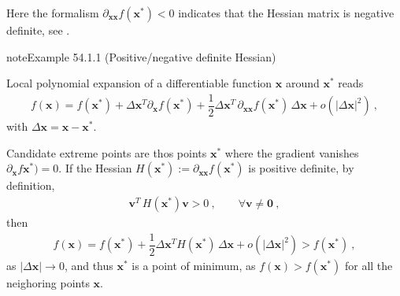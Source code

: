 \documentclass[letterpaper,10pt,english]{jupyterBook}
\begin{document}
\sphinxAtStartPar
Here the formalism \(\partial_{\mathbf{x} \mathbf{x}} f(\mathbf{x}^*) < 0\) indicates that the Hessian matrix is negative definite, see {\hyperref[\detokenize{ch/optimization/intro:optimization:hessian:extreme}]{}}.
\label{ch/optimization/intro:optimization:hessian:extreme}
\begin{sphinxadmonition}{note}{Example 54.1.1 (Positive/negative definite Hessian)}



\sphinxAtStartPar
Local polynomial expansion of a differentiable function \(\mathbf{x}\) around \(\mathbf{x}^*\) reads
\begin{equation*}
\begin{split}f(\mathbf{x}) = f(\mathbf{x}^*) + \Delta \mathbf{x}^T \partial_{\mathbf{x}} f(\mathbf{x}^*) + \dfrac{1}{2} \Delta \mathbf{x}^T \, \partial_{\mathbf{x} \mathbf{x}} f(\mathbf{x}^*) \, \Delta \mathbf{x} + o(|\Delta\mathbf{x}|^2) \ ,\end{split}
\end{equation*}
\sphinxAtStartPar
with \(\Delta \mathbf{x} = \mathbf{x} - \mathbf{x}^*\).

\sphinxAtStartPar
Candidate extreme points are thos points \(\mathbf{x}^*\) where the gradient vanishes \(\partial_{\mathbf{x}} f\mathbf{x}^*) = 0\). If the Hessian \(H(\mathbf{x}^*) := \partial_{\mathbf{x} \mathbf{x}} f(\mathbf{x}^*)\) is positive definite, by definition,
\begin{equation*}
\begin{split}\mathbf{v}^T \, H(\mathbf{x}^*) \mathbf{v} > 0 \ , \qquad \forall \mathbf{v} \ne \mathbf{0} \ ,\end{split}
\end{equation*}
\sphinxAtStartPar
then
\begin{equation*}
\begin{split}f(\mathbf{x}) =  f(\mathbf{x}^*) + \dfrac{1}{2} \Delta \mathbf{x}^T  H(\mathbf{x}^*) \, \Delta \mathbf{x} + o(|\Delta\mathbf{x}|^2) > f(\mathbf{x}^*) \ ,\end{split}
\end{equation*}
\sphinxAtStartPar
as \(|\Delta \mathbf{x}| \rightarrow 0\), and thus \(\mathbf{x}^*\) is a point of minimum, as \(f(\mathbf{x}) > f(\mathbf{x}^*)\) for all the neighoring points \(\mathbf{x}\).
\end{sphinxadmonition}
\end{document}
